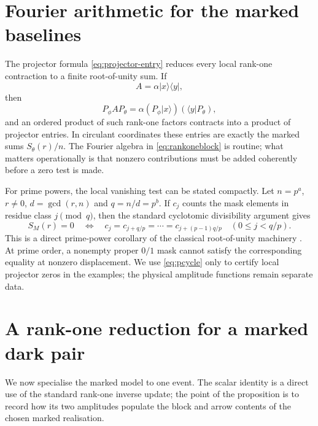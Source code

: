 \documentclass[11pt]{article}
\theoremstyle{definition}
\theoremstyle{remark}
\newcommand{\ket}[1]{\lvert #1\rangle}
\newcommand{\bra}[1]{\langle #1\rvert}
\begin{document}
\section{Fourier arithmetic for the marked baselines}\label{sec:fourier}

The projector formula \eqref{eq:projector-entry} reduces every local rank-one contraction to a finite root-of-unity sum. If
\[
A=\alpha\ket x\bra y,
\]
then
\begin{equation}\label{eq:rankoneblock}
P_\phi A P_\theta
=\alpha(P_\phi\ket x)(\bra yP_\theta),
\end{equation}
and an ordered product of such rank-one factors contracts into a product of projector entries. In circulant coordinates these entries are exactly the marked sums $S_\theta(r)/n$. The Fourier algebra in \eqref{eq:rankoneblock} is routine; what matters operationally is that nonzero contributions must be added coherently before a zero test is made.

For prime powers, the local vanishing test can be stated compactly. Let $n=p^a$, $r\ne0$, $d=\gcd(r,n)$ and $q=n/d=p^b$. If $c_j$ counts the mask elements in residue class $j\pmod q$, then the standard cyclotomic divisibility argument gives
\begin{equation}\label{eq:pcycle}
S_M(r)=0
\quad\Longleftrightarrow\quad
c_j=c_{j+q/p}=\cdots=c_{j+(p-1)q/p}
\quad (0\le j<q/p).
\end{equation}
This is a direct prime-power corollary of the classical root-of-unity machinery \parencite{LamLeung2000}. At prime order, a nonempty proper $0/1$ mask cannot satisfy the corresponding equality at nonzero displacement. We use \eqref{eq:pcycle} only to certify local projector zeros in the examples; the physical amplitude functions remain separate data.

\section{A rank-one reduction for a marked dark pair}\label{sec:oneevent}

We now specialise the marked model to one event. The scalar identity is a direct use of the standard rank-one inverse update; the point of the proposition is to record how its two amplitudes populate the block and arrow contents of the chosen marked realisation.
\end{document}
